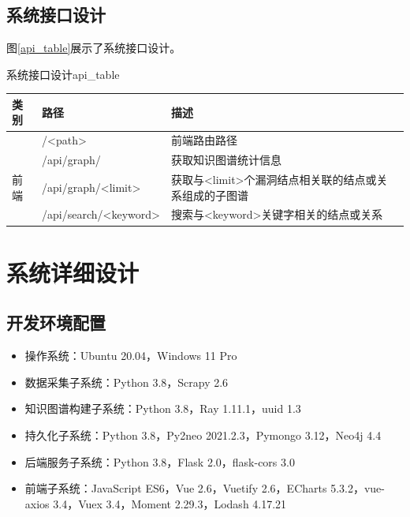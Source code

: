 \documentclass[a4paper,AutoFakeBold,oneside,12pt]{book}
\begin{document}
\subsection{系统接口设计}

图\ref{api_table}展示了系统接口设计。
\begin{bupttable}{系统接口设计}{api_table}
	\begin{tabularx}{\textwidth}{llX}
		\toprule
		\textbf{类别} & \textbf{路径}         & \textbf{描述}                                         \\ \midrule
		              & /<path>               & 前端路由路径                                          \\ \cmidrule(l){2-3}
		              & /api/graph/           & 获取知识图谱统计信息                                  \\ \cmidrule(l){2-3}
		前端          & /api/graph/<limit>    & 获取与<limit>个漏洞结点相关联的结点或关系组成的子图谱 \\ \cmidrule(l){2-3}
		              & /api/search/<keyword> & 搜索与<keyword>关键字相关的结点或关系                 \\ \bottomrule %
	\end{tabularx}
\end{bupttable}

\section{系统详细设计}

\subsection{开发环境配置}

\begin{itemize}
	\item 操作系统：Ubuntu 20.04，Windows 11 Pro
	\item 数据采集子系统：Python 3.8，Scrapy 2.6
	\item 知识图谱构建子系统：Python 3.8，Ray 1.11.1，uuid 1.3
	\item 持久化子系统：Python 3.8，Py2neo 2021.2.3，Pymongo 3.12，Neo4j 4.4
	\item 后端服务子系统：Python 3.8，Flask 2.0，flask-cors 3.0
	\item 前端子系统：JavaScript ES6，Vue 2.6，Vuetify 2.6，ECharts 5.3.2，vue-axios 3.4，Vuex 3.4，Moment 2.29.3，Lodash 4.17.21
\end{itemize}
\end{document}
